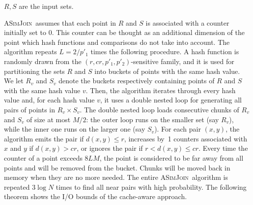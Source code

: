 \documentclass{llncs}
\newcommand{\ASimJoin}{\textsc{ASimJoin}}
\begin{document}
\SetCommentSty{}
\begin{algorithm}[!t]
\label{alg:ASimJoin}
\SetAlgoRefName{\ASimJoin$(R,S)$}
\caption{$R, S$ are the input sets.}\label{algo:awaresimjoin}
\small

\end{algorithm}

\ASimJoin\ assumes that each point in $R$ and $S$ is associated with a counter initially set to 0. 
This counter can be thought as an additional dimension of the point which hash functions and comparisons do not take into account.
The algorithm repeats $L=2/p'_1$ times the following procedure.
A hash function is randomly drawn from the $(r,cr,p'_1,p'_2)$-sensitive family, and it is used for partitioning the sets $R$ and $S$ into buckets of points with the same hash value.
We let $R_v$ and $S_v$ denote the buckets respectively containing points of $R$ and $S$ with the same hash value $v$.
Then, the algorithm iterates through every hash value and, for each hash value $v$, it uses a double nested loop for generating all pairs of points in $R_v\times S_v$.
The double nested loop loads consecutive chunks of $R_v$ and $S_v$ of size at most $M/2$: the outer loop runs on the smaller set (say $R_v$), while the inner one runs on the larger one (say $S_v$).
For each pair $(x,y)$, the algorithm emits the pair if $d(x,y)\leq r$,  increases by~1 counters associated with $x$ and $y$ if $d(x,y)>cr$,
or ignores the pair if  $r<d(x,y)\leq cr$.
Every time the counter of a point exceeds $8LM$, the point is considered to be
far away from all points and will be removed from the bucket. 
Chunks will be moved back in memory when they are no more needed. 
The entire \ASimJoin\ algorithm is repeated $3\log N$ times to find all
near pairs with high
probability. 
The following theorem shows the I/O bounds of the cache-aware approach.
\end{document}
